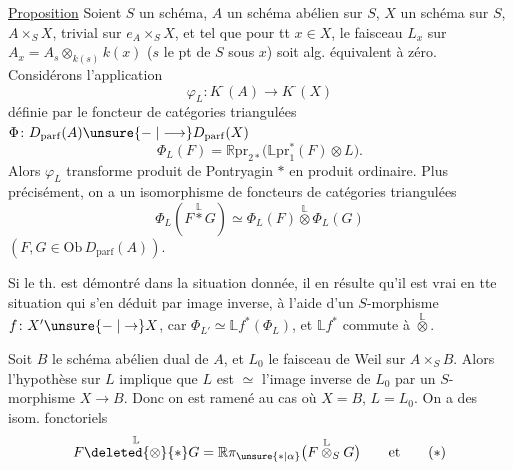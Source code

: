 \uline{Proposition}  Soient $S$ un schéma, $A$ un schéma abélien sur $S$, $X$ un schéma sur $S$,   $A\times_S X$,  trivial sur $e_A\times_S X$, et tel que  pour tt $x\in X$, le faisceau $L_x$ sur $A_x=A_s\otimes_{k(s)}k(x)$ ($s$ le pt de $S$ sous $x$) soit alg. équivalent à zéro. Considérons l'application
\[
\varphi_L\colon K^{\cdot}(A)\longrightarrow K^{\cdot}(X)
\]
définie par  le foncteur de catégories triangulées \deleted{$\unsure{\varphi}$} $\Phi\colon D_{\mathrm{parf}}(A)\unsure{\mathrel{-}|\longrightarrow}D_{\mathrm{parf}}(X)$
\[
\Phi_L(F)=\mathbb{R}\mathrm{pr}_{2*}\bigl(\mathbb{L}\mathrm{pr}_1^*(F)\otimes L\bigr).
\]
Alors $\varphi_L$ transforme produit de Pontryagin $*$ en produit ordinaire. Plus précisément, on a un isomorphisme de foncteurs de catégories triangulées
\[
\Phi_L(F\overset{\mathbb L}{*}G)\simeq\Phi_L(F)\overset{\mathbb L}{\otimes}\Phi_L(G)
\]
$(F,G\in\mathrm{Ob}\,D_{\mathrm{parf}}(A))$.

Si le th. est démontré dans la situation donnée, il en résulte qu'il est vrai en tte situation  qui s'en déduit par image inverse, à l'aide d'un $S$-morphisme $f\colon X'\unsure{\mathrel{-}|\to}X$, car $\Phi_{L'}\simeq\mathbb{L}f^*(\Phi_L)$, et $\mathbb{L}f^*$ commute à $\overset{\mathbb L}{\otimes}$.

Soit $B$ le schéma abélien dual de $A$, et $L_0$ le faisceau de Weil sur $A\times_S B$. Alors l'hypothèse sur $L$ implique que $L$ est $\simeq$ l'image inverse de $L_0$ par un $S$-morphisme $X\longrightarrow B$. Donc on est ramené au cas où $X=B$, $L=L_0$.  On a des isom. fonctoriels
\[
F\overset{\mathbb L}{\deleted{\otimes}{*}}G=\mathbb R\pi_{\unsure{*|\alpha}}\bigl(F\overset{\mathbb L}{\otimes}_S G\bigr)\qquad\text{et}\tag*{$(*)$}
\]
